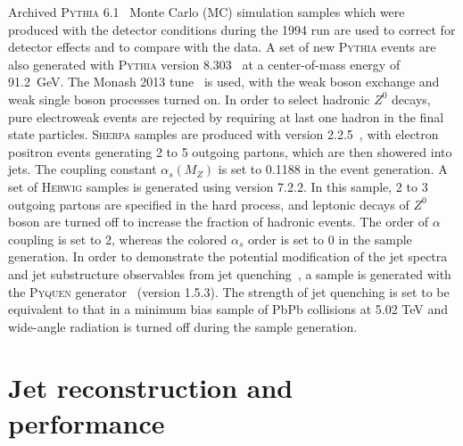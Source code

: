 \documentclass[aps,preprint,superscriptaddress,groupedaddress]{revtex4}  %
\newcommand{\sherpa}{\textsc{Sherpa}\xspace}
\newcommand{\herwig}{\textsc{Herwig}\xspace}
\newcommand{\pythia}[1]{\textsc{Pythia}{#1}\xspace}
\newcommand{\pyquen}{\textsc{Pyquen}\xspace}
\begin{document}
Archived \pythia{} 6.1~\cite{Sjostrand:2000wi} Monte Carlo (MC) simulation samples which were produced with the detector conditions during the 1994 run are used to correct for detector effects and to compare with the data. A set of new \pythia{} events are also generated with \pythia{} version 8.303~\cite{Sjostrand:2014zea} at a center-of-mass energy of 91.2~GeV.  The Monash 2013 tune~\cite{Skands:2014pea} is used, with the weak boson exchange and weak single boson processes turned on. In order to select hadronic $Z^0$ decays, pure electroweak events are rejected by requiring at last one hadron in the final state particles. \sherpa samples are produced with version 2.2.5~\cite{Gleisberg:2008ta}, with electron positron events generating 2 to 5 outgoing partons, which are then showered into jets. The coupling constant $\alpha_s (M_Z)$ is set to 0.1188 in the event generation. 
A set of \herwig\cite{Bellm:2015jjp} samples is generated using version 7.2.2. In this sample, 2 to 3 outgoing partons are specified in the hard process, and leptonic decays of $Z^0$ boson are turned off to increase the fraction of hadronic events.  The order of $\alpha$ coupling is set to 2, whereas the colored $\alpha_s$ order is set to 0 in the sample generation. In order to demonstrate the potential modification of the jet spectra and jet substructure observables from jet quenching~\cite{Bjorken:1982tu,ATLAS:2010isq,CMS:2011iwn}, a sample is generated with the \pyquen generator~\cite{Lokhtin:2005px} (version 1.5.3).  The strength of jet  quenching is set to be equivalent to that in a minimum bias sample of PbPb collisions at 5.02 TeV and wide-angle radiation is turned off during the sample generation. %

\section{\label{Section:JetReco}Jet reconstruction and performance}

\end{document}
